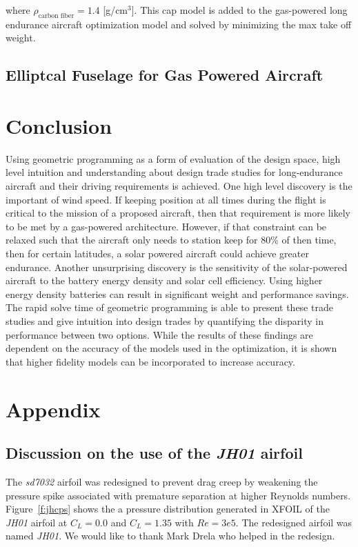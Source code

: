 \documentclass[]{aiaa-tc}%
\begin{document}
where $\rho_{\text{carbon fiber}} = 1.4$ [g/cm$^3$].
This cap model is added to the gas-powered long endurance aircraft optimization model and solved by minimizing the max take off weight.  

\subsection{Elliptcal Fuselage for Gas Powered Aircraft}

 
\section{Conclusion}

Using geometric programming as a form of evaluation of the design space, high level intuition and understanding about design trade studies for long-endurance aircraft and their driving requirements is achieved.  
One high level discovery is the important of wind speed.  
If keeping position at all times during the flight is critical to the mission of a proposed aircraft, then that requirement is more likely to be met by a gas-powered architecture.
However, if that constraint can be relaxed such that the aircraft only needs to station keep for 80\% of then time, then for certain latitudes, a solar powered aircraft could achieve greater endurance.
Another unsurprising discovery is the sensitivity of the solar-powered aircraft to the battery energy density and solar cell efficiency.  Using higher energy density batteries can result in significant weight and performance savings.  
The rapid solve time of geometric programming is able to present these trade studies and give intuition into design trades by quantifying the disparity in performance between two options.
While the results of these findings are dependent on the accuracy of the models used in the optimization, it is shown that higher fidelity models can be incorporated to increase accuracy.

\section*{Appendix}

\subsection{Discussion on the use of the \emph{JH01} airfoil}

The \emph{sd7032} airfoil was redesigned to prevent drag creep by weakening the pressure spike associated with premature separation at higher Reynolds numbers.  
Figure~\ref{f:jhcps} shows the a pressure distribution generated in XFOIL of the \emph{JH01} airfoil at $C_L=0.0$ and $C_L=1.35$ with $Re=3e5$.
The redesigned airfoil was named \emph{JH01}. We would like to thank Mark Drela who helped in the redesign.
\end{document}
